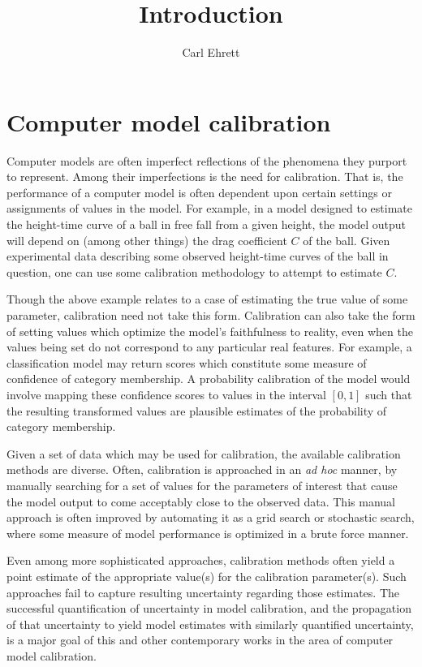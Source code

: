 \documentclass[10pt,a4paper]{article}
\author{Carl Ehrett}
\title{Introduction}
\begin{document}
	
\maketitle

\section{Computer model calibration}

Computer models are often imperfect reflections of the phenomena they purport to represent.
Among their imperfections is the need for calibration.
That is, the performance of a computer model is often dependent upon certain settings or assignments of values in the model. %
For example, in a model designed to estimate the height-time curve of a ball in free fall from a given height, the model output will depend on (among other things) the drag coefficient $C$ of the ball. %
Given experimental data describing some observed height-time curves of the ball in question, one can use some calibration methodology to attempt to estimate $C$.

Though the above example relates to a case of estimating the true value of some parameter, calibration need not take this form.
Calibration can also take the form of setting values which optimize the model's faithfulness to reality, even when the values being set do not correspond to any particular real features.
For example, a classification model may return scores which constitute some measure of confidence of category membership.
A probability calibration of the model would involve mapping these confidence scores to values in the interval $[0,1]$ such that the resulting transformed values are plausible estimates of the probability of category membership.

Given a set of data which may be used for calibration, the available calibration methods are diverse. 
Often, calibration is approached in an \textit{ad hoc} manner, by manually searching for a set of values for the parameters of interest that cause the model output to come acceptably close to the observed data.
This manual approach is often improved by automating it as a grid search or stochastic search, where some measure of model performance is optimized in a brute force manner. %

Even among more sophisticated approaches, calibration methods often yield a point estimate of the appropriate value(s) for the calibration parameter(s).
Such approaches fail to capture resulting uncertainty regarding those estimates.
The successful quantification of uncertainty in model calibration, and the propagation of that uncertainty to yield model estimates with similarly quantified uncertainty, is a major goal of this and other contemporary works in the area of computer model calibration.
\end{document}

